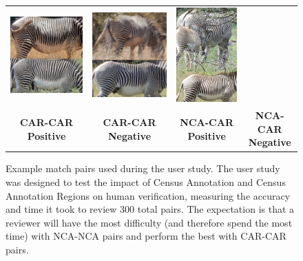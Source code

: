 \begin{figure}[!t]
\begin{center}
\begin{tabular}{cccc}
            \includegraphics[width=0.20\linewidth]{resources/pair-15704-17583-car-car-neg.pdf} &
            \includegraphics[width=0.20\linewidth]{resources/pair-2347-19088-nca-car-pos.pdf}  &
            \includegraphics[width=0.20\linewidth]{resources/pair-9132-17155-nca-car-neg.pdf}    \\
            \textbf{CAR-CAR Positive}                                                          &
            \textbf{CAR-CAR Negative}                                                          &
            \textbf{NCA-CAR Positive}                                                          &
            \textbf{NCA-CAR Negative}
        \end{tabular}
    \end{center}
    \caption{Example match pairs used during the user study.  The user study was designed to test the impact of Census Annotation and Census Annotation Regions on human verification, measuring the accuracy and time it took to review 300 total pairs.  The expectation is that a reviewer will have the most difficulty (and therefore spend the most time) with NCA-NCA pairs and perform the best with CAR-CAR pairs.}
    \label{fig:nca-ca-car-pairs}
\end{figure}

